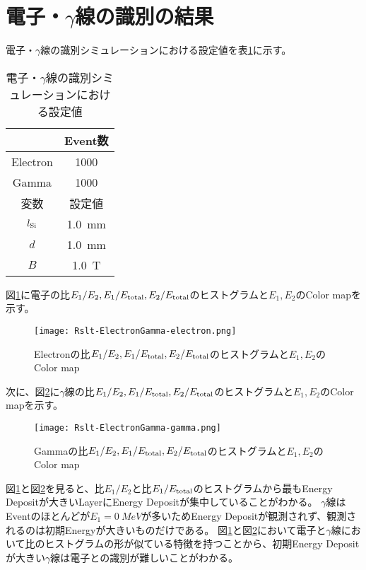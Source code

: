 \documentclass[a4paper,10pt]{jreport}
\begin{document}
\section{電子・$\gamma$線の識別の結果}

電子・$\gamma$線の識別シミュレーションにおける設定値を表\ref{Tab-ElectronGamma-Settei}に示す。

\begin{table}[H] 
	\center
	\caption{電子・$\gamma$線の識別シミュレーションにおける設定値} \label{Tab-ElectronGamma-Settei}
	\begin{tabular}{cc}
	\hline
	 & Event数 \\
	 \hline
	Electron & 1000 \\
	Gamma & 1000 \\
	\hline
	変数 & 設定値 \\
	\hline
	$l_{\rm{Si}}$ & \SI{1.0}{mm} \\
	$d$ & \SI{1.0}{mm} \\
	$B$ & \SI{1.0}{T} \\
	\hline
	\end{tabular}
\end{table}

図\ref{Rslt-ElectronGamma-electron}に電子の比$E_1/E_2,E_1/E_{\rm{total}},E_2/E_{\rm{total}}$のヒストグラムと$E_1,E_2$のColor mapを示す。

\begin{figure}[H]
	\center
	\texttt{[image: Rslt-ElectronGamma-electron.png]}
	\caption{Electronの比$E_1/E_2,E_1/E_{\rm{total}},E_2/E_{\rm{total}}$のヒストグラムと$E_1,E_2$のColor map}
	\label{Rslt-ElectronGamma-electron}
\end{figure}

次に、図\ref{Rslt-ElectronGamma-gamma}に$\gamma$線の比$E_1/E_2,E_1/E_{\rm{total}},E_2/E_{\rm{total}}$のヒストグラムと$E_1,E_2$のColor mapを示す。

\begin{figure}[H]
	\center
	\texttt{[image: Rslt-ElectronGamma-gamma.png]}
	\caption{Gammaの比$E_1/E_2,E_1/E_{\rm{total}},E_2/E_{\rm{total}}$のヒストグラムと$E_1,E_2$のColor map}
	\label{Rslt-ElectronGamma-gamma}
\end{figure}

図\ref{Rslt-ElectronGamma-electron}と図\ref{Rslt-ElectronGamma-gamma}を見ると、比$E_1/E_2$と比$E_1/E_{\rm{total}}$のヒストグラムから最もEnergy Depositが大きいLayerにEnergy Depositが集中していることがわかる。
$\gamma$線はEventのほとんどが$E_1=\SI{0}{MeV}$が多いためEnergy Depositが観測されず、観測されるのは初期Energyが大きいものだけである。
図\ref{Rslt-ElectronGamma-electron}と図\ref{Rslt-ElectronGamma-gamma}において電子と$\gamma$線において比のヒストグラムの形が似ている特徴を持つことから、初期Energy Depositが大きい$\gamma$線は電子との識別が難しいことがわかる。
\end{document}
